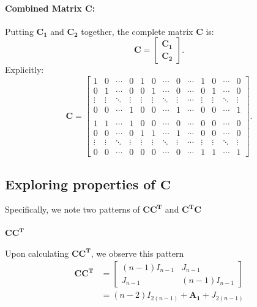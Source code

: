 \documentclass{article}
\begin{document}
\paragraph{Combined Matrix \( \mathbf{C} \):}

Putting \( \mathbf{C_1} \) and \( \mathbf{C_2} \) together, the complete matrix \( \mathbf{C} \) is:
\[
\mathbf{C} = 
\begin{bmatrix}
\mathbf{C_1} \\ 
\mathbf{C_2}
\end{bmatrix}.
\]
Explicitly:
\[
\mathbf{C} = 
\begin{bmatrix}
1 & 0 & \cdots & 0 & 1 & 0 & \cdots & 0 & \cdots & 1 & 0 & \cdots & 0 \\
0 & 1 & \cdots & 0 & 0 & 1 & \cdots & 0 & \cdots & 0 & 1 & \cdots & 0 \\
\vdots & \vdots & \ddots & \vdots & \vdots & \vdots & \ddots & \vdots & \cdots & \vdots & \vdots & \ddots & \vdots \\
0 & 0 & \cdots & 1 & 0 & 0 & \cdots & 1 & \cdots & 0 & 0 & \cdots & 1 \\ \\
1 & 1 & \cdots & 1 & 0 & 0 & \cdots & 0 & \cdots & 0 & 0 & \cdots & 0 \\
0 & 0 & \cdots & 0 & 1 & 1 & \cdots & 1 & \cdots & 0 & 0 & \cdots & 0 \\
\vdots & \vdots & \ddots & \vdots & \vdots & \vdots & \ddots & \vdots & \cdots & \vdots & \vdots & \ddots & \vdots \\
0 & 0 & \cdots & 0 & 0 & 0 & \cdots & 0 & \cdots & 1 & 1 & \cdots & 1
\end{bmatrix}.
\]

\subsection{Exploring properties of $\mathbf{C}$}
Specifically, we note two patterns of \(\mathbf{CC^T}\) and \(\mathbf{C^T C}\)

\paragraph{\(\mathbf{CC^T}\)}
Upon calculating \(\mathbf{CC^T}\), we observe this pattern
\begin{align*}
\mathbf{CC^T} &=
\begin{bmatrix}
    (n-1)I_{n-1} & J_{n-1} \\
    J_{n-1} & (n-1)I_{n-1}
\end{bmatrix}\\
&= (n-2)I_{2(n-1)} + \mathbf{A_1} + J_{2(n-1)} 
\end{align*}
\end{document}
